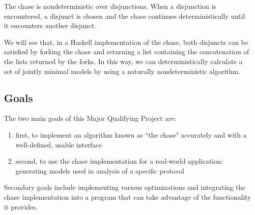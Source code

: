 		The chase is nondeterministic over disjunctions. When a disjunction is
		encountered, a disjunct is chosen and the chase continues
		deterministically until it encounters another disjunct.

		We will see that, in a Haskell implementation of the chase, both
		disjuncts can be satisfied by forking the chase and returning a list
		containing the concatenation of the lists returned by the forks. In
		this way, we can deterministically calculate a set of jointly minimal
		models by using a naturally nondeterministic algorithm.

	\subsection{Goals}

		The two main goals of this Major Qualifying Project are:

		\begin{enumerate}
		\item first, to implement an algorithm known as ``the chase" accurately
		and with a well-defined, usable interface
		\item second, to use the chase implementation for a real-world
		application: generating models used in analysis of a specific protocol
		\end{enumerate}

		Secondary goals include implementing various optimizations and
		integrating the chase implementation into a program that can take
		advantage of the functionality it provides.
